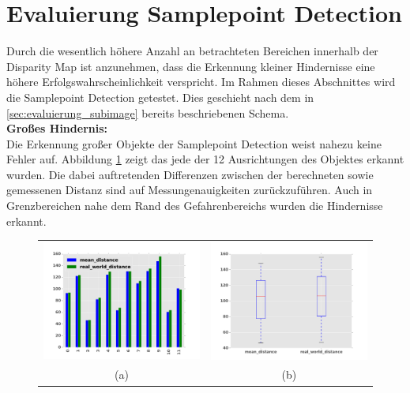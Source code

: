 \section{Evaluierung Samplepoint Detection}
\label{sec:evaluierung_samplepoint}

	\noindent
	Durch die wesentlich höhere Anzahl an betrachteten Bereichen innerhalb der Disparity Map ist anzunehmen, dass die Erkennung kleiner Hindernisse eine höhere Erfolgswahrscheinlichkeit verspricht. Im Rahmen dieses Abschnittes wird die Samplepoint Detection getestet. Dies geschieht nach dem in \ref{sec:evaluierung_subimage} bereits beschriebenen Schema.\\

	\noindent
	\textbf{Großes Hindernis:}\\
	Die Erkennung großer Objekte der Samplepoint Detection weist nahezu keine Fehler auf. Abbildung \ref{fig:sample_eval_big} zeigt das jede der 12 Ausrichtungen des Objektes erkannt wurden. Die dabei auftretenden Differenzen zwischen der berechneten sowie gemessenen Distanz sind auf Messungenauigkeiten zurückzuführen. Auch in Grenzbereichen nahe dem Rand des Gefahrenbereichs wurden die Hindernisse erkannt. 
	
    \begin{figure}[h]
		\centering
		\begin{tabular}{cc}
		\includegraphics[width=7cm]{img/evaluation/sample_big_bar}&
		\includegraphics[width=7cm]{img/evaluation/sample_big_box}\\
		 (a) & (b)
		\end{tabular}
		\caption{}
	    \label{fig:sample_eval_big}
	\end{figure}

